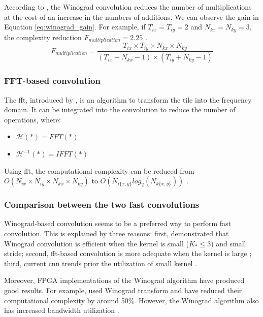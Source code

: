 According to \textcite{winograd_arithmetic_1980}, the Winograd convolution reduces the number of multiplications at the cost of an increase in the numbers of additions. We can observe the gain in Equation \eqref{eq:winograd_gain}. For example, if $T_{ix} = T_{iy} = 2$ and $N_{kx} = N_{ky} = 3$, the complexity reduction $F_{multiplication} = 2.25$ \cite{lavin_fast_2015}.
%
\begin{equation}
    F_{multiplication} = \frac{T_{ix} \times T_{iy} \times N_{kx} \times N_{ky}}{(T_{ix} + N_{kx} - 1) \times (T_{iy} + N_{ky} - 1)}
    \label{eq:winograd_gain}
\end{equation}
%
\subsubsection{FFT-based convolution}
%
The \acrshort{fft}, introduced by \textcite{cooley_algorithm_1965}, is an algorithm to transform the tile into the frequency domain. It can be integrated into the convolution to reduce the number of operations, where:
\begin{itemize}
    \item $\mathcal{H}(*) = FFT(*)$
    \item $\mathcal{H}^{-1}(*) = IFFT(*)$
\end{itemize}
%
Using \acrshort{fft}, the computational complexity can be reduced from $O(N_{ix} \times N_{iy} \times N_{kx} \times N_{ky})$ to $O(N_{i\{x,y\}} log_2(N_{k\{x,y\}}))$ \cite{w_smith_scientist_1997}.
%
\subsubsection{Comparison between the two fast convolutions}
%
Winograd-based convolution seems to be a preferred way to perform fast convolution. This is explained by three reasons: first, \textcite{lavin_fast_2015} demonstrated that Winograd convolution is efficient when the kernel is small ($K_* \leq 3$) and small stride; second, \acrshort{fft}-based convolution is more adequate when the kernel is large \cite{ahmad_towards_2019, chitsaz_acceleration_2020}; third, current \acrshort{cnn} trends prior the utilization of small kernel \cite{liang_evaluating_2020, sandler_mobilenetv2_2019}.

Moreover, FPGA implementations of the Winograd algorithm have produced good results. For example, \cite{aydonat_opencl_2017, liang_evaluating_2020} used Winograd transform and have reduced their computational complexity by around 50\%. However, the Winograd algorithm also has increased bandwidth utilization \cite{xiao_exploring_2017}.

